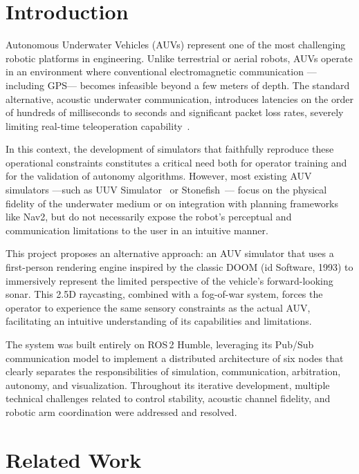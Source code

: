 \documentclass[10pt,twocolumn,letterpaper]{article}
\begin{document}
\section{Introduction}
\label{sec:introduction}

Autonomous Underwater Vehicles (AUVs) represent one of the most challenging robotic platforms in engineering. Unlike terrestrial or aerial robots, AUVs operate in an environment where conventional electromagnetic communication ---including GPS--- becomes infeasible beyond a few meters of depth. The standard alternative, acoustic underwater communication, introduces latencies on the order of hundreds of milliseconds to seconds and significant packet loss rates, severely limiting real-time teleoperation capability~\cite{stojanovic2009}.

In this context, the development of simulators that faithfully reproduce these operational constraints constitutes a critical need both for operator training and for the validation of autonomy algorithms. However, most existing AUV simulators ---such as UUV Simulator~\cite{uuvsim2016} or Stonefish~\cite{stonefish2020}--- focus on the physical fidelity of the underwater medium or on integration with planning frameworks like Nav2, but do not necessarily expose the robot's perceptual and communication limitations to the user in an intuitive manner.

This project proposes an alternative approach: an AUV simulator that uses a first-person rendering engine inspired by the classic DOOM (id Software, 1993) to immersively represent the limited perspective of the vehicle's forward-looking sonar. This 2.5D raycasting, combined with a fog-of-war system, forces the operator to experience the same sensory constraints as the actual AUV, facilitating an intuitive understanding of its capabilities and limitations.

The system was built entirely on ROS\,2 Humble, leveraging its Pub/Sub communication model to implement a distributed architecture of six nodes that clearly separates the responsibilities of simulation, communication, arbitration, autonomy, and visualization. Throughout its iterative development, multiple technical challenges related to control stability, acoustic channel fidelity, and robotic arm coordination were addressed and resolved.

\section{Related Work}
\label{sec:related_work}
\end{document}
